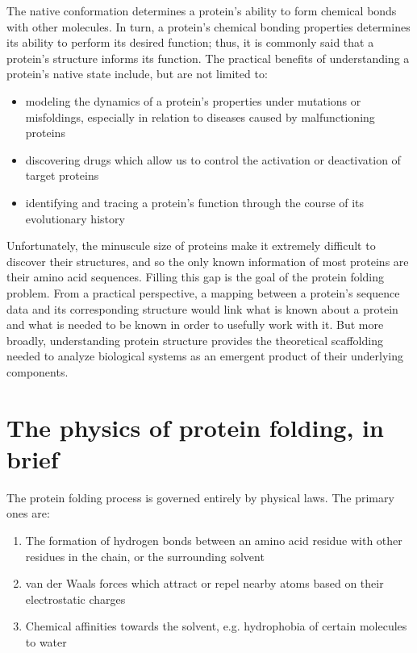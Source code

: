 \documentclass{article}
\begin{document}
The native conformation determines a protein's ability to form chemical bonds with other molecules. In turn, a protein's chemical bonding properties determines its ability to perform its desired function; thus, it is commonly said that a protein's structure informs its function. The practical benefits of understanding a protein's native state include, but are not limited to:

\begin{itemize}
    \item modeling the dynamics of a protein's properties under mutations or misfoldings, especially in relation to diseases caused by malfunctioning proteins
    \item discovering drugs which allow us to control the activation or deactivation of target proteins
    \item identifying and tracing a protein's function through the course of its evolutionary history
\end{itemize}

Unfortunately, the minuscule size of proteins make it extremely difficult to discover their structures, and so the only known information of most proteins are their amino acid sequences. Filling this gap is the goal of the protein folding problem. From a practical perspective, a mapping between a protein's sequence data and its corresponding structure would link what is known about a protein and what is needed to be known in order to usefully work with it. But more broadly, understanding protein structure provides the theoretical scaffolding needed to analyze biological systems as an emergent product of their underlying components.

\section{The physics of protein folding, in brief}
The protein folding process is governed entirely by physical laws. The primary ones are:

\begin{enumerate}
    \item The formation of hydrogen bonds between an amino acid residue with other residues in the chain, or the surrounding solvent
    \item van der Waals forces which attract or repel nearby atoms based on their electrostatic charges
    \item Chemical affinities towards the solvent, e.g. hydrophobia of certain molecules to water
\end{enumerate}
\end{document}
